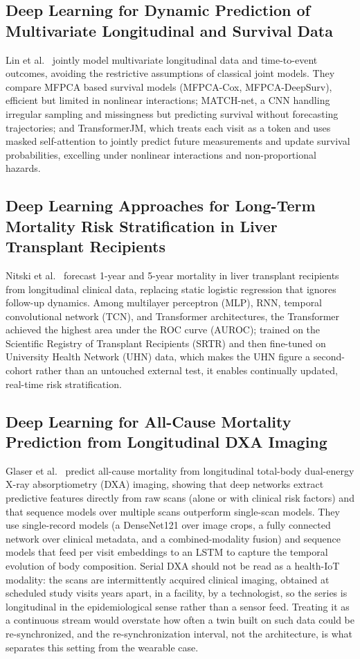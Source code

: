 \documentclass[journal]{IEEEtran}
\begin{document}
\subsection{Deep Learning for Dynamic Prediction of Multivariate Longitudinal and Survival Data}
Lin et al.~\cite{lin2022deep} jointly model multivariate longitudinal data and time-to-event outcomes, avoiding the restrictive assumptions of classical joint models. They compare MFPCA based survival models (MFPCA-Cox, MFPCA-DeepSurv), efficient but limited in nonlinear interactions; MATCH-net, a CNN handling irregular sampling and missingness but predicting survival without forecasting trajectories; and TransformerJM, which treats each visit as a token and uses masked self-attention to jointly predict future measurements and update survival probabilities, excelling under nonlinear interactions and non-proportional hazards.

\subsection{Deep Learning Approaches for Long-Term Mortality Risk Stratification in Liver Transplant Recipients}

Nitski et al.~\cite{nitski2021long} forecast 1-year and 5-year mortality in liver transplant recipients from longitudinal clinical data, replacing static logistic regression that ignores follow-up dynamics. Among multilayer perceptron (MLP), RNN, temporal convolutional network (TCN), and Transformer architectures, the Transformer achieved the highest area under the ROC curve (AUROC); trained on the Scientific Registry of Transplant Recipients (SRTR) and then fine-tuned on University Health Network (UHN) data, which makes the UHN figure a second-cohort rather than an untouched external test, it enables continually updated, real-time risk stratification.


\subsection{Deep Learning for All-Cause Mortality Prediction from Longitudinal DXA Imaging}

Glaser et al.~\cite{glaser2022deep} predict all-cause mortality from longitudinal total-body dual-energy X-ray absorptiometry (DXA) imaging, showing that deep networks extract predictive features directly from raw scans (alone or with clinical risk factors) and that sequence models over multiple scans outperform single-scan models. They use single-record models (a DenseNet121 over image crops, a fully connected network over clinical metadata, and a combined-modality fusion) and sequence models that feed per visit embeddings to an LSTM to capture the temporal evolution of body composition. Serial DXA should not be read as a health-IoT modality: the scans are intermittently acquired clinical imaging, obtained at scheduled study visits years apart, in a facility, by a technologist, so the series is longitudinal in the epidemiological sense rather than a sensor feed. Treating it as a continuous stream would overstate how often a twin built on such data could be re-synchronized, and the re-synchronization interval, not the architecture, is what separates this setting from the wearable case.
\end{document}
